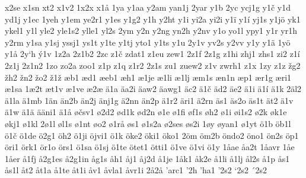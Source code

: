 x2se
x1sn
xt2
x1v2
1x2x
x1å
1ya
y1aa
y2am
yan1j
2yar
y1b
2yc
ycj1g
y1č
y1d
yd1j
y1ec
1yeh
y1em
ye2r1
y1es
y1g2
y1h
y2ht
y1i
yi2a
yi2i
y1ï
y1í
yj1s
y1jö
yk1
ykel1
y1l
yle2
yle1s2
ylle1
yl2s
2ym
y2n
y2ng
yn2h
y2nv
y1o
yo1l
ypy1
y1r
yr1h
y2rm
y1sa
y1sj
yssj1
ys1t
y1te
y1tj
yto1
y1ts
y1u
2y1v
yv2s
y2vv
y1y
y1ä
1yö
y1å
2y`h
ý1v
1z2a
2z1b2
2zc
z1č
zdat1
z1eu
zew1
2z1f
2z1g
z1hi
zhj1
zhs1
zi2
z1í
2z1j
2z1n2
1zo
zo2a
zoo1
z1p
z1q
z1r2
2z1s
zu1
zuew2
z1v
zwrh1
z1x
1zy
z1z
žg2
žh2
žn2
žo2
ž1ž
æb1
æd1
æeb1
æh1
æ1je
æ1li
æ1lj
æm1s
æn1n
æp1
ær1g
æri1
æ1sa
1æ2t
æt1v
æ1ve
æ2æ
ä1a
äa2i
äaw2
äawg1
äc2
ä1č
äd2
äe2
ä1i
ä1í
ä1k
2äl2
ä1la
ä1mb
1än
än2b
än2j
änj1g
ä2nn
än2p
ä1r2
äri1
ä2rn
äs1
äs2o
äs1t
ät2
ä1v
ä1w
ä1ä
ääni1
ä1å
øčsv1
ø2d2
ød1k
ød2n
ø1e
ø1fi
øf1s
øh2
ø1i
øi1s2
ø2k
øk1e
økj1
ø1kl
2ø1l
øl1s
ø1nt
øo2
ø1rå
øs1
ø1s2a
ø2ses
øs2i
1øy
øyan1
ø1yt
ö1b
öb1l
ö1č
ö1de
ö2g1
öh2
ö1ji
öjvi1
ö1k
öke2
öki1
öko1
2öm
öm2b
öndo2
öno1
ön2s
öp1
öri1
örk1
ör1o
örs1
ö1sa
ö1sj
ö1te
ötet1
ötti1
ö1ve
ö1vi
ö1y
1åae
åa2t
1åavr
1åe
1åer
å1fj
å2g1es
å2g1in
åg1s
åh1
åj1
åj2d
å1je
1åk1
åk2e
å1li
å1lj
ål2s
å1p
ås1
ås1l
åt2
åt1a
å1te
åt1i
åv1
åvla1
åvr1i
2å2å
'arc1
'2h
'ha1
'2s2
`2s2
´2s2
